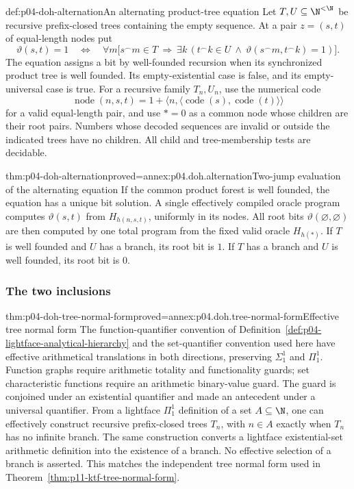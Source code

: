 \begin{hbdefinition}{def:p04-doh-alternation}{An alternating product-tree equation}
Let \(T,U\subseteq\N^{<\N}\) be recursive prefix-closed trees containing
the empty sequence. At a pair \(z=(s,t)\) of equal-length nodes put
\[
 \vartheta(s,t)=1\quad\Longleftrightarrow\quad
 \forall m\bigl[s^\frown m\in T\ \Longrightarrow\
       \exists k\,(t^\frown k\in U\ \land\
                \vartheta(s^\frown m,t^\frown k)=1)\bigr].
\]
The equation assigns a bit by well-founded recursion when its synchronized
product tree is well founded. Its empty-existential case is false, and its
empty-universal case is true. For a recursive family \(T_n,U_n\), use
the numerical code
\[
 \operatorname{node}(n,s,t)=
  1+\langle n,\langle\operatorname{code}(s),\operatorname{code}(t)\rangle\rangle
\]
for a valid equal-length pair, and use \(*=0\) as a common node whose
children are their root pairs. Numbers whose decoded sequences are invalid
or outside the indicated trees have no children. All child and
tree-membership tests are decidable.
\end{hbdefinition}

\begin{hblemma}{thm:p04-doh-alternation}{proved=annex:p04.doh.alternation}{Two-jump evaluation of the alternating equation}
If the common product forest is well founded, the equation has a unique
bit solution. A single effectively compiled oracle program computes
\(\vartheta(s,t)\) from \(H_{h(n,s,t)}\), uniformly in its nodes.
All root bits \(\vartheta(\varnothing,\varnothing)\) are then computed
by one total program from the fixed valid oracle \(H_{h(*)}\).
If \(T\) is well founded and \(U\) has a branch, its root bit is \(1\).
If \(T\) has a branch and \(U\) is well founded, its root bit is \(0\).
\end{hblemma}

\subsubsection{The two inclusions}

\begin{hblemma}{thm:p04-doh-tree-normal-form}{proved=annex:p04.doh.tree-normal-form}{Effective tree normal form}
The function-quantifier convention of
Definition~\ref{def:p04-lightface-analytical-hierarchy} and the
set-quantifier convention used here have effective arithmetical translations
in both directions, preserving \(\Sigma^1_1\) and \(\Pi^1_1\).
Function graphs require arithmetic totality and functionality guards;
set characteristic functions require an arithmetic binary-value guard.
The guard is conjoined under an existential quantifier and made an
antecedent under a universal quantifier.
From a lightface \(\Pi^1_1\) definition of a set \(A\subseteq\N\), one
can effectively construct recursive prefix-closed trees \(T_n\), with
\(n\in A\) exactly when \(T_n\) has no infinite branch. The same
construction converts a lightface existential-set arithmetic definition
into the existence of a branch. No effective selection of a branch is
asserted. This matches the independent tree normal form used in
Theorem~\ref{thm:p11-ktf-tree-normal-form}.
\end{hblemma}

